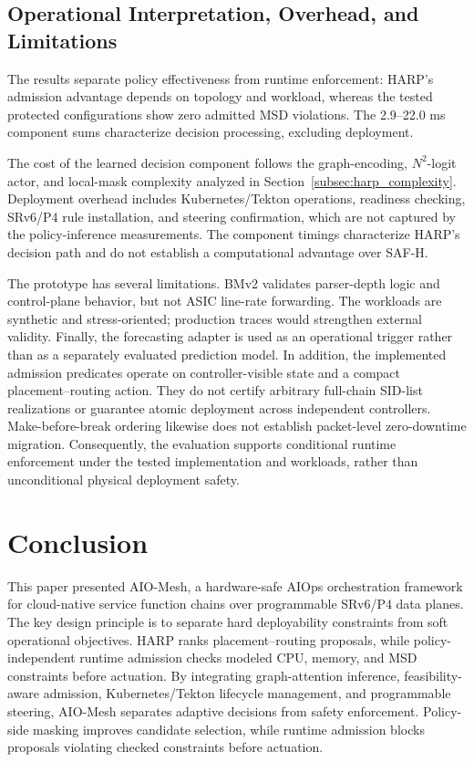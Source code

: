 \documentclass[final,5p]{elsarticle}
\newcommand{\rev}[1]{\textcolor{BrickRed}{#1}}
\begin{document}
\subsection{Operational Interpretation, Overhead, and Limitations}
\label{subsec:operational_interpretation}

\rev{The results separate policy effectiveness from runtime enforcement: HARP's admission advantage depends on topology and workload, whereas the tested protected configurations show zero admitted MSD violations. The 2.9--22.0 ms component sums characterize decision processing, excluding deployment.}

\rev{The cost of the learned decision component follows the graph-encoding, \(N^2\)-logit actor, and local-mask complexity analyzed in Section~\ref{subsec:harp_complexity}. Deployment overhead includes Kubernetes/Tekton operations, readiness checking, SRv6/P4 rule installation, and steering confirmation, which are not captured by the policy-inference measurements. \rev{The component timings characterize HARP's decision path and do not establish a computational advantage over SAF-H.}}

\rev{The prototype has several limitations.} BMv2 validates parser-depth logic and control-plane behavior, but not ASIC line-rate forwarding. The workloads are synthetic and stress-oriented; production traces would strengthen external validity. Finally, the forecasting adapter is used as an operational trigger rather than as a separately evaluated prediction model. \rev{In addition, the implemented admission predicates operate on controller-visible state and a compact placement--routing action. They do not certify arbitrary full-chain SID-list realizations or guarantee atomic deployment across independent controllers. Make-before-break ordering likewise does not establish packet-level zero-downtime migration. Consequently, the evaluation supports conditional runtime enforcement under the tested implementation and workloads, rather than unconditional physical deployment safety.}

\section{Conclusion}
\label{sec:conclusion}
This paper presented AIO-Mesh, a hardware-safe AIOps orchestration framework for cloud-native service function chains over programmable SRv6/P4 data planes. The key design principle is to separate hard deployability constraints from soft operational objectives. HARP ranks placement--routing proposals, while policy-independent runtime admission checks modeled CPU, memory, and MSD constraints before actuation. \rev{By integrating graph-attention inference, feasibility-aware admission, Kubernetes/Tekton lifecycle management, and programmable steering, AIO-Mesh separates adaptive decisions from safety enforcement. Policy-side masking improves candidate selection, while runtime admission blocks proposals violating checked constraints before actuation.}
\end{document}
